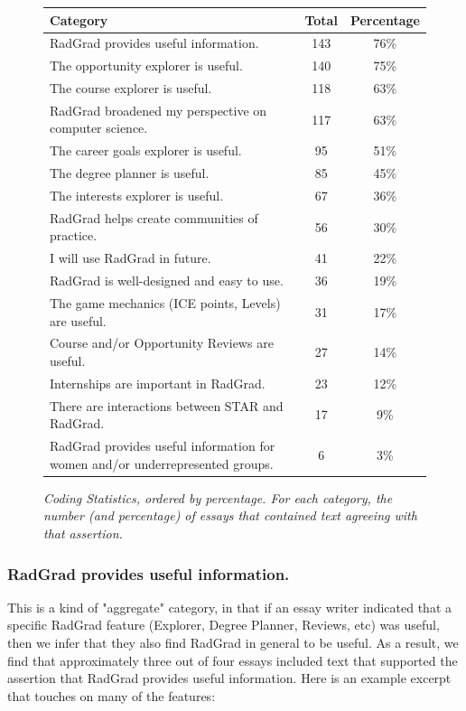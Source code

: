 \documentclass[acmsmall,nonacm]{acmart}
\begin{document}
\begin{figure}[th]
\centering
\small
\begin{tabular}{ p{4in} c c }
\hline
 Category &  Total & Percentage   \\
\hline
RadGrad provides useful information.                  & 143 & 76\% \\
The opportunity explorer is useful.                   & 140 & 75\% \\
The course explorer is useful.                        & 118 & 63\% \\
RadGrad broadened my perspective on computer science. & 117 & 63\% \\
The career goals explorer is useful.                  & 95 & 51\% \\
The degree planner is useful.                         & 85 & 45\% \\
The interests explorer is useful.                     & 67 & 36\% \\
RadGrad helps create communities of practice.         & 56 & 30\% \\
I will use RadGrad in future.                         & 41 & 22\% \\
RadGrad is well-designed and easy to use.             & 36 & 19\% \\
The game mechanics (ICE points, Levels) are useful.   & 31 & 17\% \\
Course and/or Opportunity Reviews are useful.         & 27 & 14\% \\
Internships are important in RadGrad.                 & 23 & 12\% \\
There are interactions between STAR and RadGrad.      & 17 & 9\% \\
RadGrad provides useful information
for women and/or underrepresented groups.             & 6 & 3\% \\
\hline
\end{tabular}
\caption{\em Coding Statistics, ordered by percentage. For each category, the number (and percentage) of essays that contained text agreeing with that assertion.}
\normalsize
\label{fig:coding-stats}
\end{figure}

\subsubsection{RadGrad provides useful information.} This is a kind of "aggregate" category, in that if an essay writer indicated that a specific RadGrad feature (Explorer, Degree Planner, Reviews, etc) was useful, then we infer that they also find RadGrad in general to be useful. As a result, we find that approximately three out of four essays included text that supported the assertion that RadGrad provides useful information. Here is an example excerpt that touches on many of the features:
\end{document}
